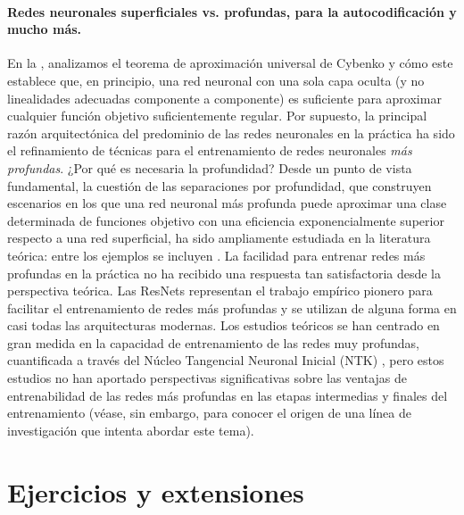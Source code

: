\documentclass[../../book-main_es.tex]{subfiles}
\begin{document}
\paragraph{Redes neuronales superficiales vs. profundas, para la autocodificación y mucho más.}
En la , analizamos el teorema de aproximación universal de Cybenko
y cómo este establece que, en principio, una red neuronal con una sola
capa oculta (y no linealidades adecuadas componente a componente) es suficiente para
aproximar cualquier función objetivo suficientemente regular. Por supuesto, la
principal razón arquitectónica del predominio de las redes neuronales en la práctica ha
sido el refinamiento de técnicas para el entrenamiento de redes neuronales \textit{más profundas}.
¿Por qué es necesaria la profundidad?
Desde un punto de vista fundamental, la cuestión de las separaciones por profundidad, que
construyen escenarios en los que una red neuronal más profunda puede aproximar una clase determinada
de funciones objetivo con una eficiencia exponencialmente superior respecto a una red
superficial,
ha sido ampliamente estudiada en la literatura teórica:
entre los ejemplos se incluyen \cite{Telgarsky2016-sn,Bresler2020-xy,Venturi2021-qc}.
La facilidad para entrenar redes más profundas
en la práctica no ha recibido una respuesta tan satisfactoria desde
la perspectiva teórica.
Las ResNets \cite{he2016deep} representan el trabajo empírico pionero
para facilitar el entrenamiento de redes más profundas y se utilizan de alguna forma
en casi todas las arquitecturas modernas. Los estudios teóricos se han centrado en gran medida en
la capacidad de entrenamiento de las redes muy profundas, cuantificada a través del Núcleo Tangencial Neuronal Inicial (NTK)
\cite{Buchanan2021-sj,Martens2021-cx}, pero estos estudios no han aportado
perspectivas significativas sobre las ventajas de entrenabilidad de las redes más profundas en las etapas
intermedias y finales del entrenamiento (véase, sin embargo, \cite{Yang2021-gw} para conocer el origen de una línea
de investigación que intenta abordar este tema).

\section{Ejercicios y extensiones}
\end{document}
